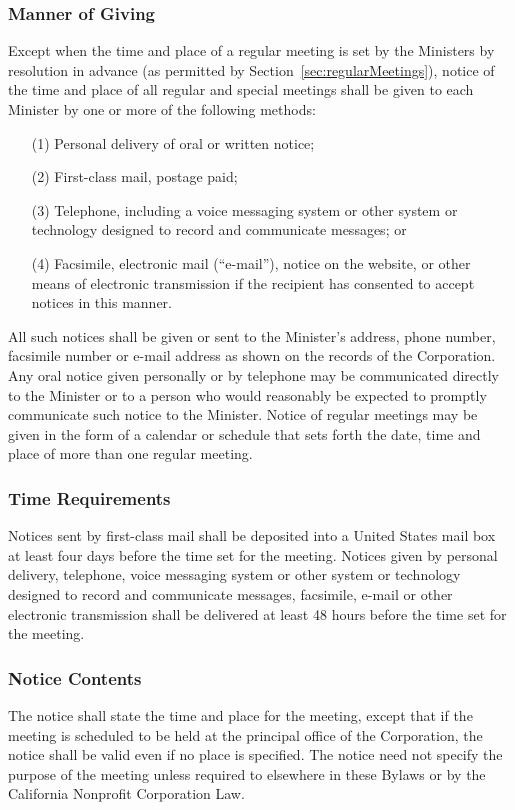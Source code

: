 \documentclass[letterpaper,titlepage]{article}
\begin{document}
\subsubsection{Manner of Giving}
\label{sec:mannerGiving}
Except when the time and place of a regular meeting is set by the Ministers by
resolution in advance (as permitted by Section~\ref{sec:regularMeetings}),
notice of the time and place of all regular and special meetings shall be given
to each Minister by one or more of the following methods:
\begin{itemize}
    \item[(1)] Personal delivery of oral or written notice;
    \item[(2)] First-class mail, postage paid;
    \item[(3)] Telephone, including a voice messaging system or other system or
        technology designed to record and communicate messages; or
    \item[(4)] Facsimile, electronic mail (``e-mail''), notice on the website,
        or other means of electronic transmission if the recipient has
        consented to accept notices in this manner.
\end{itemize}
All such notices shall be given or sent to the Minister's address, phone
number, facsimile number or e-mail address as shown on the records of the
Corporation.  Any oral notice given personally or by telephone may be
communicated directly to the Minister or to a person who would reasonably be
expected to promptly communicate such notice to the Minister. Notice of regular
meetings may be given in the form of a calendar or schedule that sets forth the
date, time and place of more than one regular meeting.
\subsubsection{Time Requirements}
\label{sec:timeRequirements}
Notices sent by first-class mail shall be deposited into a United States mail
box at least four days before the time set for the meeting. Notices given by
personal delivery, telephone, voice messaging system or other system or
technology designed to record and communicate messages, facsimile, e-mail or
other electronic transmission shall be delivered at least 48 hours before the
time set for the meeting.
\subsubsection{Notice Contents}
\label{sec:noticeContents}
The notice shall state the time and place for the meeting, except that if the
meeting is scheduled to be held at the principal office of the Corporation, the
notice shall be valid even if no place is specified. The notice need not
specify the purpose of the meeting unless required to elsewhere in these Bylaws
or by the California Nonprofit Corporation Law.
\end{document}
